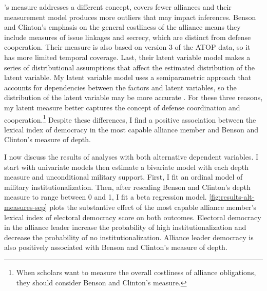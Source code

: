 \documentclass[12pt]{article}
\begin{document}
\citet{BensonClinton2016}'s measure addresses a different concept, covers fewer alliances and their measurement model produces more outliers that may impact inferences.
Benson and Clinton's emphasis on the general costliness of the alliance means they include measures of issue linkages and secrecy, which are distinct from defense cooperation. 
Their measure is also based on version 3 of the ATOP data, so it has more limited temporal coverage. 
Last, their latent variable model makes a series of distributional assumptions that affect the estimated distribution of the latent variable. 
My latent variable model uses a semiparametric approach that accounts for dependencies between the factors and latent variables, so the distribution of the latent variable may be more accurate \citep{Murrayetal2013}.
For these three reasons, my latent measure better captures the concept of defense coordination and cooperation.\footnote{When scholars want to measure the overall costliness of alliance obligations, they should consider Benson and Clinton's measure.} 
Despite these differences, I find a positive association between the lexical index of democracy in the most capable alliance member and Benson and Clinton's measure of depth. 


I now discuss the results of analyses with both alternative dependent variables. 
I start with univariate models then estimate a bivariate model with each depth measure and unconditional military support. 
First, I fit an ordinal model of military institutionalization. 
Then, after rescaling Benson and Clinton's depth measure to range between 0 and 1, I fit a beta regression model. 
\autoref{fig:results-alt-measures-sep} plots the substantive effect of the most capable alliance member's lexical index of electoral democracy score on both outcomes. 
Electoral democracy in the alliance leader increase the probability of high institutionalization and decrease the probability of no institutionalization. 
Alliance leader democracy is also positively associated with Benson and Clinton's measure of depth. 
\end{document}
